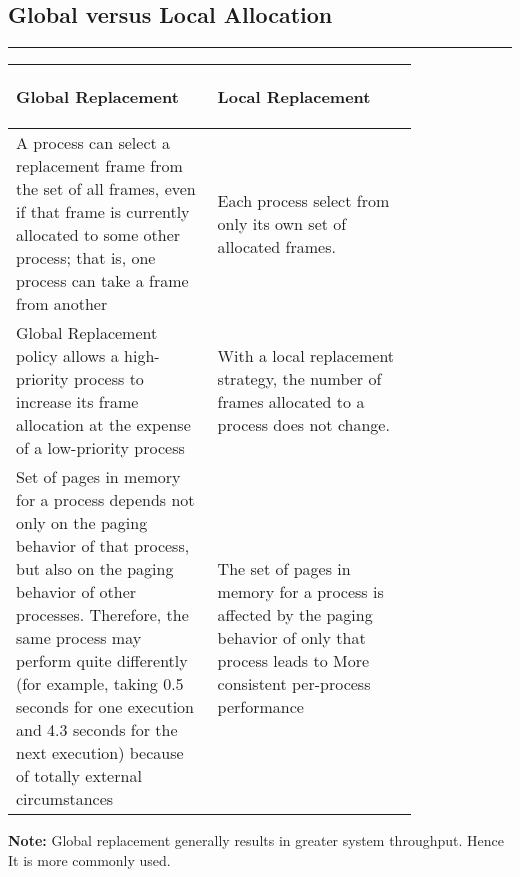 \documentclass[12pt,onecolumn]{IEEEtran}
\begin{document}
\subsection{Global versus Local Allocation}
\hrule
\vspace{3mm}

\begin{table}[H]
	\centering
	\begin{tabular}{|p{0.4\linewidth} | p{0.4\linewidth}|}
		\hline
		\begin{center} {\textbf{Global Replacement}}  \end{center} &  \begin{center} {\textbf{Local Replacement}}  \end{center} \\
		\hline
		\vspace{3mm} A process can
	select a replacement frame from the set of all frames, even if that frame is
	currently allocated to some other process; that is, one process can take a frame
	from another \vspace{3mm} & \vspace{3mm} Each process select from only its
	own set of allocated frames. \\
	\hline
	\vspace{3mm}
	Global Replacement policy allows a high-priority process to
	increase its frame allocation at the expense of a low-priority process \vspace{3mm} & \vspace{3mm} With a local replacement strategy, the number of frames allocated to a process
	does not change.\\
	\hline
	\vspace{3mm}
	Set of pages
	in memory for a process depends not only on the paging behavior of that process, but also on the paging behavior of other processes. Therefore, the same
	process may perform quite differently (for example, taking 0.5 seconds for one
	execution and 4.3 seconds for the next execution) because of totally external
	circumstances \vspace{3mm} & \vspace{3mm} The set of pages in memory for a process is affected by the
	paging behavior of only that process leads to More consistent per-process performance \\
	\hline
	\end{tabular}
\end{table}

\textbf{Note:} Global replacement generally results in greater system throughput. Hence It is more commonly used.
\vspace{3mm}
\end{document}
